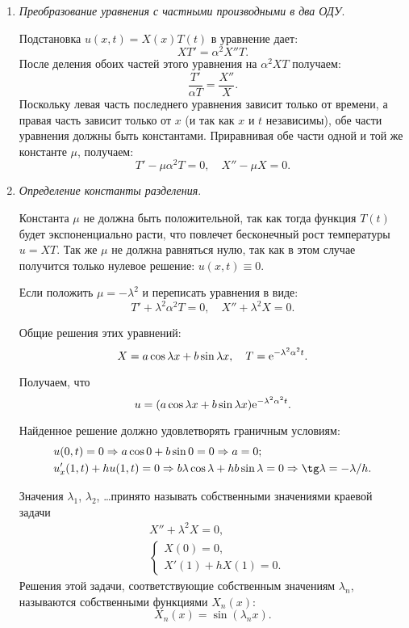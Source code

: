 \begin{enumerate}
    \item \emph{Преобразование уравнения с частными производными в два ОДУ}.
    
    Подстановка \( u(x, t) = X(x)T(t) \) в уравнение дает:
    \[
        XT' = \alpha^2 X''T.
    \]
    После деления обоих частей этого уравнения на \( \alpha^2 XT \) получаем:
    \[
        \frac{T'}{\alpha T} = \frac{X''}{X}.
    \]
    Поскольку левая часть последнего уравнения зависит только от времени, а
    правая часть зависит только от \( x \) (и так как \( x \) и \( t \)
    независимы), обе части уравнения должны быть константами. Приравнивая обе
    части одной и той же константе \( \mu \), получаем:
    \[
        T' - \mu\alpha^2 T = 0, \quad X'' - \mu X = 0.
    \]

    \item \emph{Определение константы разделения}.
    
    Константа \( \mu \) не должна быть положительной, так как тогда функция
    \( T(t) \) будет экспоненциально расти, что повлечет бесконечный рост
    температуры \( u = XT \). Так же \( \mu \) не должна равняться нулю, так как в этом
    случае получится только нулевое решение: \( u(x, t) \equiv 0 \).
    
    Если положить \( \mu = -\lambda^2 \) и переписать уравнения в виде:
    \[
        T' + \lambda^2\alpha^2 T = 0, \quad X'' + \lambda^2 X = 0.
    \]
    
    Общие решения этих уравнений:
    \[
        X = a\cos\lambda x + b\sin\lambda x, \quad T = \mathrm{e}^{-\lambda^2\alpha^2 t}.
    \]

    Получаем, что
    \[
        u = (a\cos\lambda x + b\sin\lambda x)\mathrm{e}^{-\lambda^2\alpha^2 t}.
    \]

    Найденное решение должно удовлетворять граничным условиям:
    \begin{align*}
        & u(0, t) = 0 \Rightarrow a\cos0 + b\sin0 = 0 \Rightarrow a = 0; \\
        & u'_x(1, t) + hu(1, t) = 0 \Rightarrow b\lambda\cos\lambda +
        hb\sin\lambda = 0 \Rightarrow \tg\lambda = -\lambda/h.
    \end{align*}
    
    Значения \( \lambda_1 \), \( \lambda_2 \), \ldots принято называть
    собственными значениями краевой задачи
    \begin{align*}
        & X'' + \lambda^2 X = 0, \\
        & \left\{ \begin{array}{l}
            X(0) = 0, \\
            X'(1) + hX(1) = 0.
        \end{array} \right.
    \end{align*}
    Решения этой задачи, соответствующие собственным значениям \( \lambda_n \),
    называются собственными функциями \( X_n(x) \):
    \[
        X_n(x) = \sin(\lambda_nx).
    \]
    

\end{enumerate}
